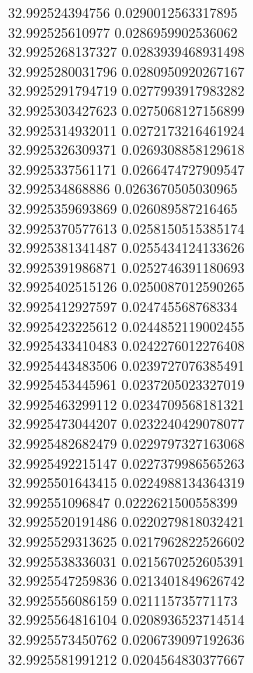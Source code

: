{32.992524394756	0.0290012563317895\\
32.992525610977	0.0286959902536062\\
32.9925268137327	0.0283939468931498\\
32.9925280031796	0.0280950920267167\\
32.9925291794719	0.0277993917983282\\
32.9925303427623	0.0275068127156899\\
32.9925314932011	0.0272173216461924\\
32.9925326309371	0.0269308858129618\\
32.9925337561171	0.0266474727909547\\
32.992534868886	0.0263670505030965\\
32.9925359693869	0.026089587216465\\
32.9925370577613	0.0258150515385174\\
32.9925381341487	0.0255434124133626\\
32.9925391986871	0.0252746391180693\\
32.9925402515126	0.0250087012590265\\
32.9925412927597	0.024745568768334\\
32.9925423225612	0.0244852119002455\\
32.9925433410483	0.0242276012276408\\
32.9925443483506	0.0239727076385491\\
32.9925453445961	0.0237205023327019\\
32.9925463299112	0.0234709568181321\\
32.9925473044207	0.0232240429078077\\
32.9925482682479	0.0229797327163068\\
32.9925492215147	0.0227379986565263\\
32.9925501643415	0.0224988134364319\\
32.992551096847	0.0222621500558399\\
32.9925520191486	0.0220279818032421\\
32.9925529313625	0.0217962822526602\\
32.9925538336031	0.0215670252605391\\
32.9925547259836	0.0213401849626742\\
32.9925556086159	0.021115735771173\\
32.9925564816104	0.0208936523714514\\
32.9925573450762	0.0206739097192636\\
32.9925581991212	0.0204564830377667\\
}
